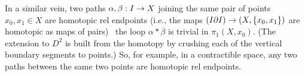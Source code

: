 In a similar vein, two paths $\alpha,\beta:I\rightarrow X$ joining the same pair of points
$x_0,x_1\in X$ are homotopic rel endpoints (i.e., the maps $(I\partial I)\rightarrow(X,\{x_0,x_1\})$
are homotopic as maps of pairs) \lra\ the loop $\alpha *\overline{\beta}$ is 
trivial in $\pi_1(X,x_0)$. (The extension to $D^2$ is built from the
homotopy by crushing each of the vertical boundary segments to points.) So, for
example, in a contractible space, any two paths between the same two points are
homotopic rel endpoints.



